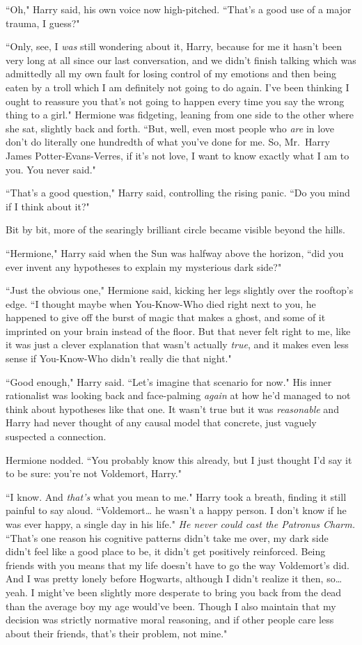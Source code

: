 ``Oh," Harry said, his own voice now high-pitched. ``That's a good use of a major trauma, I guess?"

``Only, see, I \emph{was} still wondering about it, Harry, because for me it hasn't been very long at all since our last conversation, and we didn't finish talking which was admittedly all my own fault for losing control of my emotions and then being eaten by a troll which I am definitely not going to do again. I've been thinking I ought to reassure you that's not going to happen every time you say the wrong thing to a girl." Hermione was fidgeting, leaning from one side to the other where she sat, slightly back and forth. ``But, well, even most people who \emph{are} in love don't do literally one hundredth of what you've done for me. So, Mr.~Harry James Potter-Evans-Verres, if it's not love, I want to know exactly what I am to you. You never said."

``That's a good question," Harry said, controlling the rising panic. ``Do you mind if I think about it?"

Bit by bit, more of the searingly brilliant circle became visible beyond the hills.

``Hermione," Harry said when the Sun was halfway above the horizon, ``did you ever invent any hypotheses to explain my mysterious dark side?"

``Just the obvious one," Hermione said, kicking her legs slightly over the rooftop's edge. ``I thought maybe when You-Know-Who died right next to you, he happened to give off the burst of magic that makes a ghost, and some of it imprinted on your brain instead of the floor. But that never felt right to me, like it was just a clever explanation that wasn't actually \emph{true}, and it makes even less sense if You-Know-Who didn't really die that night."

``Good enough," Harry said. ``Let's imagine that scenario for now." His inner rationalist was looking back and face-palming \emph{again} at how he'd managed to not think about hypotheses like that one. It wasn't true but it was \emph{reasonable} and Harry had never thought of any causal model that concrete, just vaguely suspected a connection.

Hermione nodded. ``You probably know this already, but I just thought I'd say it to be sure: you're not Voldemort, Harry."

``I know. And \emph{that's} what you mean to me." Harry took a breath, finding it still painful to say aloud. ``Voldemort{\ldots} he wasn't a happy person. I don't know if he was ever happy, a single day in his life." \emph{He never could cast the Patronus Charm.} ``That's one reason his cognitive patterns didn't take me over, my dark side didn't feel like a good place to be, it didn't get positively reinforced. Being friends with you means that my life doesn't have to go the way Voldemort's did. And I was pretty lonely before Hogwarts, although I didn't realize it then, so{\ldots} yeah. I might've been slightly more desperate to bring you back from the dead than the average boy my age would've been. Though I also maintain that my decision was strictly normative moral reasoning, and if other people care less about their friends, that's their problem, not mine."

